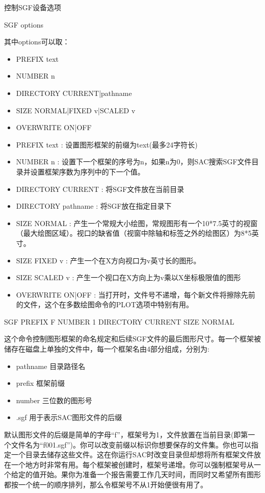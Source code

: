 \label{cmd:sgf}

控制SGF设备选项

SGF {options}

其中options可以取：
\begin{itemize}
\item PREFIX text  
\item NUMBER n  
\item DIRECTORY CURRENT|pathname  
\item SIZE NORMAL|FIXED v|SCALED v  
\item OVERWRITE ON|OFF  
\end{itemize}

\begin{itemize}
\item PREFIX text : 设置图形框架的前缀为text(最多24字符长)
\item NUMBER n : 设置下一个框架的序号为n，如果n为0，则SAC搜索SGF文件目录并设置框架序数为序列中的下一个值。 
\item DIRECTORY CURRENT : 将SGF文件放在当前目录 
\item DIRECTORY pathname : 将SGF放在指定目录下 
\item SIZE NORMAL : 产生一个常规大小绘图，常规图形有一个10*7.5英寸的视窗（最大绘图区域）。视口的缺省值（视窗中除轴和标签之外的绘图区）为8*5英寸。
\item SIZE FIXED v : 产生一个在X方向视口为v英寸长的图形。 
\item SIZE SCALED v : 产生一个视口在X方向上为v乘以X坐标极限值的图形  
\item OVERWRITE ON|OFF : 当打开时，文件号不递增，每个新文件将擦除先前的文件，这个在多数绘图命令的PLOT选项中特别有用。 
\end{itemize}

SGF PREFIX F NUMBER 1 DIRECTORY CURRENT SIZE NORMAL

这个命令控制图形框架的命名规定和后续SGF文件的最后图形尺寸。每一个框架被储存在磁盘上单独的文件中，每一个框架名由4部分组成，分别为:
\begin{itemize}
\item pathname 目录路径名
\item prefix 框架前缀
\item number 三位数的图形号
\item .sgf 用于表示SAC图形文件的后缀
\end{itemize}

默认图形文件的后缀是简单的字母``f''，框架号为1，文件放置在当前目录(即第一个文件名为``f001.sgf'')。你可以改变前缀以标识你想要保存的文件集。你也可以指定一个目录去储存这些文件。这在你运行SAC时改变目录但却想将所有框架文件放在一个地方时非常有用。每个框架被创建时，框架号递增。你可以强制框架号从一个给定的值开始。果你为准备一个报告需要工作几天时间，而同时又希望所有图形都按一个统一的顺序排列，那么令框架号不从1开始便很有用了。

